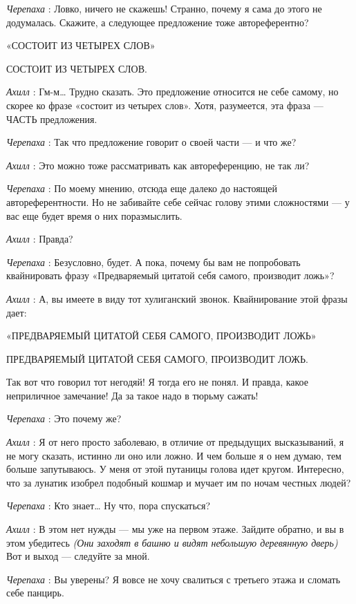 \documentclass[../main.tex]{subfiles}
\begin{document}
\begin{dialogue}
\emph{Черепаха} : Ловко, ничего не скажешь! Странно, почему я сама до этого не додумалась. Скажите, а следующее предложение тоже автореферентно?

«СОСТОИТ ИЗ ЧЕТЫРЕХ СЛОВ»

СОСТОИТ ИЗ ЧЕТЫРЕХ СЛОВ.

\emph{Ахилл} : Гм-м\ldots{} Трудно сказать. Это предложение относится не себе самому, но скорее ко фразе «состоит из четырех слов». Хотя, разумеется, эта фраза --- ЧАСТЬ предложения.

\emph{Черепаха} : Так что предложение говорит о своей части --- и что же?

\emph{Ахилл} : Это можно тоже рассматривать как автореференцию, не так ли?

\emph{Черепаха} : По моему мнению, отсюда еще далеко до настоящей автореферентности. Но не забивайте себе сейчас голову этими сложностями --- у вас еще будет время о них поразмыслить.

\emph{Ахилл} : Правда?

\emph{Черепаха} : Безусловно, будет. А пока, почему бы вам не попробовать квайнировать фразу «Предваряемый цитатой себя самого, производит ложь»?

\emph{Ахилл} : А, вы имеете в виду тот хулиганский звонок. Квайнирование этой фразы дает:

«ПРЕДВАРЯЕМЫЙ ЦИТАТОЙ СЕБЯ САМОГО, ПРОИЗВОДИТ ЛОЖЬ»

ПРЕДВАРЯЕМЫЙ ЦИТАТОЙ СЕБЯ САМОГО, ПРОИЗВОДИТ ЛОЖЬ.

Так вот что говорил тот негодяй! Я тогда его не понял. И правда, какое неприличное замечание! Да за такое надо в тюрьму сажать!

\emph{Черепаха} : Это почему же?

\emph{Ахилл} : Я от него просто заболеваю, в отличие от предыдущих высказываний, я не могу сказать, истинно ли оно или ложно. И чем больше я о нем думаю, тем больше запутываюсь. У меня от этой путаницы голова идет кругом. Интересно, что за лунатик изобрел подобный кошмар и мучает им по ночам честных людей?

\emph{Черепаха} : Кто знает\ldots{} Ну что, пора спускаться?

\emph{Ахилл} : В этом нет нужды --- мы уже на первом этаже. Зайдите обратно, и вы в этом убедитесь \emph{(Они заходят в башню и видят небольшую деревянную дверь)} Вот и выход --- следуйте за мной.

\emph{Черепаха} : Вы уверены? Я вовсе не хочу свалиться с третьего этажа и сломать себе панцирь.


\end{dialogue}
\end{document}
